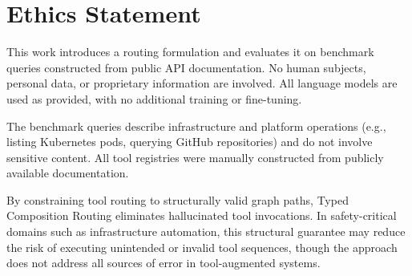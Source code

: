 \section*{Ethics Statement}
\label{sec:ethics}

This work introduces a routing formulation and evaluates it on benchmark queries constructed from public API documentation.
No human subjects, personal data, or proprietary information are involved.
All language models are used as provided, with no additional training or fine-tuning.

The benchmark queries describe infrastructure and platform operations (e.g., listing Kubernetes pods, querying GitHub repositories) and do not involve sensitive content.
All tool registries were manually constructed from publicly available documentation.

By constraining tool routing to structurally valid graph paths, Typed Composition Routing eliminates hallucinated tool invocations.
In safety-critical domains such as infrastructure automation, this structural guarantee may reduce the risk of executing unintended or invalid tool sequences, though the approach does not address all sources of error in tool-augmented systems.
